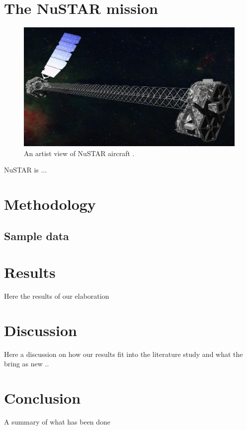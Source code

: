 \documentclass[a4paper]{article}
\begin{document}
\newpage

 \section{The NuSTAR mission}
         \begin{figure}[ht]
	          \begin{center}
	            	\includegraphics[width = 12cm]{NuSTAR_artist.jpg}
		            \caption{An artist view of NuSTAR aircraft \citep[Credits, NASA][]{Harrison2013}.}
		            \label{fig:fig_NuS}
            	\end{center}
          \end{figure}

 NuSTAR is ...
\newpage
 \section{Methodology}

        \subsection{Sample data}

\newpage

\section{Results}
Here the results of our elaboration

\section{Discussion}
Here a discussion on how our results fit into the literature study and what the bring as new ..

\section{Conclusion}

A summary of what has been done





\newpage

{}

\end{document}
